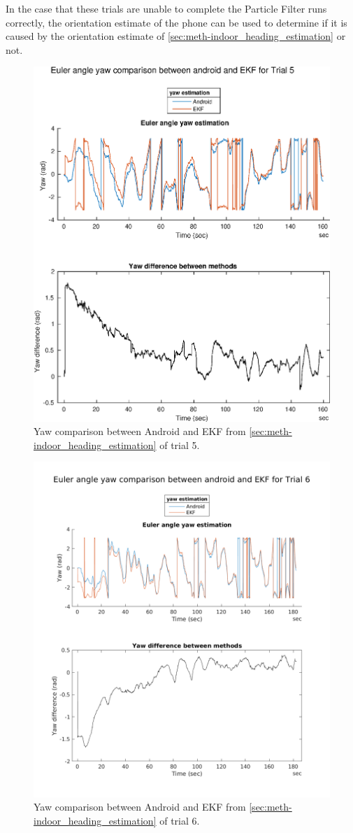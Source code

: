 In the case that these trials are unable to complete the Particle Filter runs correctly, the orientation estimate of the phone can be used to determine if it is caused by the orientation estimate of \cref{sec:meth-indoor_heading_estimation} or not.
\newpage
{}
\begin{figure}[H]
	\centering
	\includegraphics[width=0.6\linewidth]{images/20201201_1218_Yaw_difference_between_methods}
	\setlength{\belowcaptionskip}{-20pt}
	\caption{ Yaw comparison between Android and EKF from \cref{sec:meth-indoor_heading_estimation} of trial 5.}
	\label{fig:trial5_yawdifferencebetweenmethods}
\end{figure}
\begin{figure}[H]
	\centering
	\includegraphics[width=0.7\linewidth]{images/20201201_1219_Yaw_difference_between_methods}
	\setlength{\abovecaptionskip}{-20pt}
	\setlength{\belowcaptionskip}{-20pt}
	\caption{Yaw comparison between Android and EKF from \cref{sec:meth-indoor_heading_estimation} of trial 6.}
	\label{fig:trial6_yawdifferencebetweenmethods}
\end{figure}
\restoregeometry
\newpage
